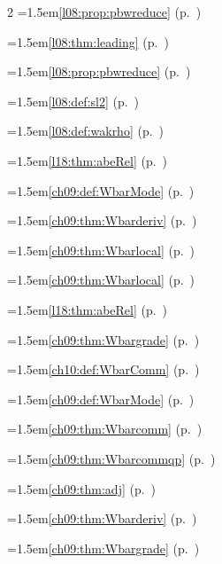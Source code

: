 \begin{multicols}{2}
\hangindent=1.5em\quad \ref{l08:prop:pbwreduce} (p.~\pageref{l08:prop:pbwreduce})\par
\hangindent=1.5em\quad \ref{l08:thm:leading} (p.~\pageref{l08:thm:leading})\par
\hangindent=1.5em\quad \ref{l08:prop:pbwreduce} (p.~\pageref{l08:prop:pbwreduce})\par
\hangindent=1.5em\quad \ref{l08:def:sl2} (p.~\pageref{l08:def:sl2})\par
\hangindent=1.5em\quad \ref{l08:def:wakrho} (p.~\pageref{l08:def:wakrho})\par
\hangindent=1.5em\quad \ref{l18:thm:abeRel} (p.~\pageref{l18:thm:abeRel})\par
\hangindent=1.5em\quad \ref{ch09:def:WbarMode} (p.~\pageref{ch09:def:WbarMode})\par
\hangindent=1.5em\quad \ref{ch09:thm:Wbarderiv} (p.~\pageref{ch09:thm:Wbarderiv})\par
\hangindent=1.5em\quad \ref{ch09:thm:Wbarlocal} (p.~\pageref{ch09:thm:Wbarlocal})\par
\hangindent=1.5em\quad \ref{ch09:thm:Wbarlocal} (p.~\pageref{ch09:thm:Wbarlocal})\par
\hangindent=1.5em\quad \ref{l18:thm:abeRel} (p.~\pageref{l18:thm:abeRel})\par
\hangindent=1.5em\quad \ref{ch09:thm:Wbargrade} (p.~\pageref{ch09:thm:Wbargrade})\par
\hangindent=1.5em\quad \ref{ch10:def:WbarComm} (p.~\pageref{ch10:def:WbarComm})\par
\hangindent=1.5em\quad \ref{ch09:def:WbarMode} (p.~\pageref{ch09:def:WbarMode})\par
\hangindent=1.5em\quad \ref{ch09:thm:Wbarcomm} (p.~\pageref{ch09:thm:Wbarcomm})\par
\hangindent=1.5em\quad \ref{ch09:thm:Wbarcommqp} (p.~\pageref{ch09:thm:Wbarcommqp})\par
\hangindent=1.5em\quad \ref{ch09:thm:adj} (p.~\pageref{ch09:thm:adj})\par
\hangindent=1.5em\quad \ref{ch09:thm:Wbarderiv} (p.~\pageref{ch09:thm:Wbarderiv})\par
\hangindent=1.5em\quad \ref{ch09:thm:Wbargrade} (p.~\pageref{ch09:thm:Wbargrade})\par

\end{multicols}

